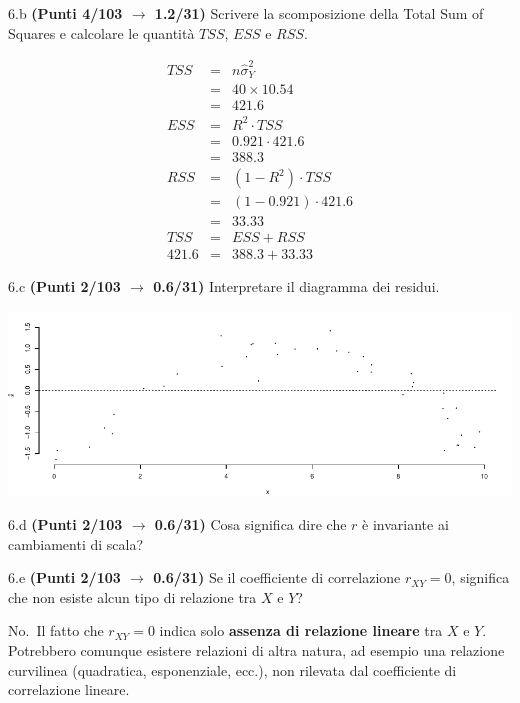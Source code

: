 \documentclass[
  11pt,
]{book}
\theoremstyle{mytheoremstyle}
\theoremstyle{mydefstyle}
\newenvironment{sol}
  {
  \begin{tcolorbox}[enhanced,breakable,arc=0.1mm,boxrule=1pt,colback=white,colframe=iblue,
  title=\bf \fontfamily{lmss}\selectfont \hspace{.5 cm} Soluzione,drop fuzzy shadow]

}{
\end{tcolorbox}
  }
\begin{document}
6.b \textbf{(Punti 4/103 \(\rightarrow\) 1.2/31)} Scrivere la scomposizione della Total Sum of Squares e calcolare le quantità \(TSS\), \(ESS\) e \(RSS\).

\begin{sol}
\begin{eqnarray*}
   TSS &=& n\hat\sigma^2_Y\\
      &=& 40 \times 10.54 \\
      &=&  421.6 \\
   ESS &=& R^2\cdot TSS\\
      &=&  0.921 \cdot 421.6 \\
      &=& 388.3 \\
   RSS &=& (1-R^2)\cdot TSS\\
      &=& (1- 0.921 )\cdot 421.6 \\
      &=&  33.33 \\
   TSS &=& ESS+RSS \\ 421.6  &=&  388.3 + 33.33 
  \end{eqnarray*}

\end{sol}

6.c \textbf{(Punti 2/103 \(\rightarrow\) 0.6/31)} Interpretare il diagramma dei residui.

\begin{center}\includegraphics{Esami_passati_con_soluzioni_files/figure-latex/1.6c-1} \end{center}

6.d \textbf{(Punti 2/103 \(\rightarrow\) 0.6/31)} Cosa significa dire che \(r\) è invariante ai cambiamenti di scala?

6.e \textbf{(Punti 2/103 \(\rightarrow\) 0.6/31)} Se il coefficiente di correlazione \(r_{XY} = 0\), significa che non esiste alcun tipo di relazione tra \(X\) e \(Y\)?

\begin{sol}
No.~Il fatto che \(r_{XY}=0\) indica solo \textbf{assenza di relazione lineare} tra \(X\) e \(Y\). Potrebbero comunque esistere relazioni di altra natura, ad esempio una relazione curvilinea (quadratica, esponenziale, ecc.), non rilevata dal coefficiente di correlazione lineare.

\end{sol}
\end{document}
